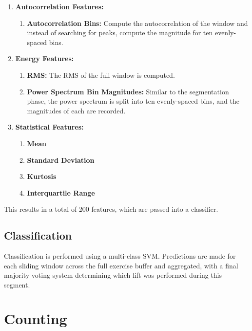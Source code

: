 \begin{enumerate}
    \item \textbf{Autocorrelation Features:}
    \begin{enumerate}
        \item \textbf{Autocorrelation Bins:} Compute the autocorrelation of the window and instead of searching for peaks, compute the magnitude for ten evenly-spaced bins.
    \end{enumerate}
    \item \textbf{Energy Features:}
    \begin{enumerate}
        \item \textbf{RMS:} The RMS of the full window is computed. 
        \item \textbf{Power Spectrum Bin Magnitudes:} Similar to the segmentation phase, the power spectrum is split into ten evenly-spaced bins, and the magnitudes of each are recorded.
    \end{enumerate}
    \item \textbf{Statistical Features:}
    \begin{enumerate}
        \item \textbf{Mean}
        \item \textbf{Standard Deviation}
        \item \textbf{Kurtosis}
        \item \textbf{Interquartile Range}
    \end{enumerate}
\end{enumerate}

This results in a total of 200 features, which are passed into a classifier.

\subsection{Classification}
Classification is performed using a multi-class SVM. Predictions are made for each sliding window across the full exercise buffer and aggregated, with a final majority voting system determining which lift was performed during this segment.

\section{Counting}

\subsection{}